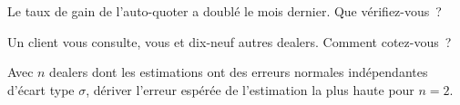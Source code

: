 \begin{interviewq}\label{iq:hf:bond-and-etf-request-for-quote-market-making:4}
Le taux de gain de l'auto-quoter a doublé le mois dernier. Que vérifiez-vous~?
\end{interviewq}

\begin{interviewq}\label{iq:hf:bond-and-etf-request-for-quote-market-making:5}
Un client vous consulte, vous et dix-neuf autres dealers. Comment cotez-vous~?
\end{interviewq}

\begin{interviewq}\label{iq:hf:bond-and-etf-request-for-quote-market-making:6}
Avec $n$ dealers dont les estimations ont des erreurs normales indépendantes d'écart type $\sigma$, dériver l'erreur espérée de l'estimation la plus haute pour
$n=2$.
\end{interviewq}
